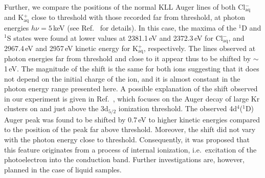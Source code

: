 Further, we compare the positions of the normal KLL Auger lines of both Cl$^{-}_{\text{aq}}$ and K$^{+}_{\text{aq}}$ close to threshold with those recorded far from threshold, at photon energies $h\nu = 5$\,keV (see Ref.\ \citep{ceolin17:263003} for details). In this case, the maxima of the $^1$D and $^1$S states were found at lower values at 2381.1\,eV and 2372.3\,eV for Cl$^{-}_{\text{aq}}$, and 2967.4\,eV and 2957\,eV kinetic energy for K$^{+}_{\text{aq}}$, respectively. The lines observed at photon energies far from threshold and close to it appear thus to be shifted by $\sim$1\,eV. The magnitude of the shift is the same for both ions suggesting that it does not depend on the initial charge of the ion, and it is almost constant in the photon energy range presented here.
A possible explanation of the shift observed in our experiment is given in Ref.\ \cite{tchaplyguine07:124314}, which focuses on the Auger decay of large Kr clusters on and just above the 3d$_{5/2}$ ionization threshold. The observed 4d$^{4}$($^1$D) Auger peak was found to be shifted by 0.7\,eV to higher kinetic energies compared to the position of the peak far above threshold. Moreover, the shift did not vary with the photon energy close to threshold. Consequently, it was proposed that this feature originates from a process of internal ionization, i.e.\ excitation of the photoelectron into the conduction band. Further investigations are, however, planned in the case of liquid samples.

